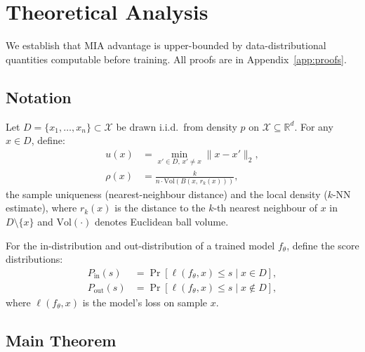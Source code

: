 
\section{Theoretical Analysis}
\label{sec:theory}

We establish that MIA advantage is upper-bounded by data-distributional
quantities computable before training.
All proofs are in Appendix~\ref{app:proofs}.

\subsection{Notation}

Let $D = \{x_1,\dots,x_n\} \subset \mathcal{X}$ be drawn i.i.d.\ from
density $p$ on $\mathcal{X} \subseteq \mathbb{R}^d$.
For any $x \in D$, define:
\begin{align}
  u(x) &= \min_{x' \in D,\, x'\neq x} \|x - x'\|_2,
           \label{eq:uniqueness}\\
  \rho(x) &= \frac{k}{ n \cdot \mathrm{Vol}(B(x,\, r_k(x)))},
           \label{eq:density}
\end{align}
the sample uniqueness (nearest-neighbour distance) and the local density
($k$-NN estimate), where $r_k(x)$ is the distance to the $k$-th nearest
neighbour of $x$ in $D \setminus \{x\}$ and $\mathrm{Vol}(\cdot)$ denotes
Euclidean ball volume.

For the in-distribution and out-distribution of a trained model
$f_\theta$, define the score distributions:
\begin{align}
  P_{\mathrm{in}}(s) &= \Pr[\ell(f_\theta, x) \leq s \mid x \in D],\\
  P_{\mathrm{out}}(s) &= \Pr[\ell(f_\theta, x) \leq s \mid x \notin D],
\end{align}
where $\ell(f_\theta,x)$ is the model's loss on sample $x$.

\subsection{Main Theorem}

